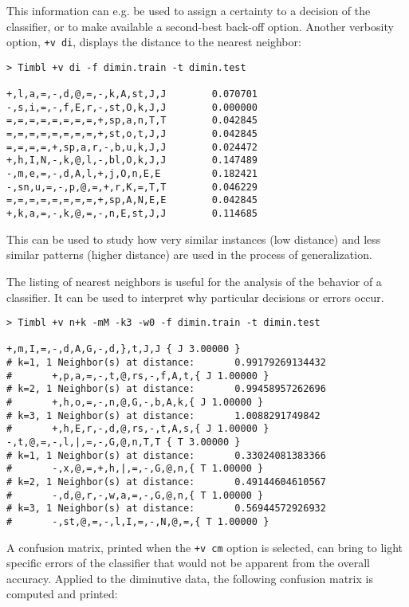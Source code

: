 \documentclass{report}
\begin{document}
This information can e.g. be used to assign a certainty to a decision
of the classifier, or to make available a second-best back-off
option. Another verbosity option, {\tt +v di}, displays the distance
to the nearest neighbor:

{\footnotesize
\begin{verbatim}
> Timbl +v di -f dimin.train -t dimin.test

+,l,a,=,-,d,@,=,-,k,A,st,J,J        0.070701
-,s,i,=,-,f,E,r,-,st,O,k,J,J        0.000000
=,=,=,=,=,=,=,=,+,sp,a,n,T,T        0.042845
=,=,=,=,=,=,=,=,+,st,o,t,J,J        0.042845
=,=,=,=,+,sp,a,r,-,b,u,k,J,J        0.024472
+,h,I,N,-,k,@,l,-,bl,O,k,J,J        0.147489
-,m,e,=,-,d,A,l,+,j,O,n,E,E         0.182421
-,sn,u,=,-,p,@,=,+,r,K,=,T,T        0.046229
=,=,=,=,=,=,=,=,+,sp,A,N,E,E        0.042845
+,k,a,=,-,k,@,=,-,n,E,st,J,J        0.114685        
\end{verbatim}
}

This can be used to study how very similar instances (low distance) and
less similar patterns (higher distance) are used in the process of
generalization.

The listing of nearest neighbors is useful for the analysis of the
behavior of a classifier. It can be used to interpret why particular
decisions or errors occur.

{\footnotesize
\begin{verbatim}
> Timbl +v n+k -mM -k3 -w0 -f dimin.train -t dimin.test

+,m,I,=,-,d,A,G,-,d,},t,J,J { J 3.00000 }
# k=1, 1 Neighbor(s) at distance:       0.99179269134432
#       +,p,a,=,-,t,@,rs,-,f,A,t,{ J 1.00000 }
# k=2, 1 Neighbor(s) at distance:       0.99458957262696
#       +,h,o,=,-,n,@,G,-,b,A,k,{ J 1.00000 }
# k=3, 1 Neighbor(s) at distance:       1.0088291749842
#       +,h,E,r,-,d,@,rs,-,t,A,s,{ J 1.00000 }
-,t,@,=,-,l,|,=,-,G,@,n,T,T { T 3.00000 }
# k=1, 1 Neighbor(s) at distance:       0.33024081383366
#       -,x,@,=,+,h,|,=,-,G,@,n,{ T 1.00000 }
# k=2, 1 Neighbor(s) at distance:       0.49144604610567
#       -,d,@,r,-,w,a,=,-,G,@,n,{ T 1.00000 }
# k=3, 1 Neighbor(s) at distance:       0.56944572926932
#       -,st,@,=,-,l,I,=,-,N,@,=,{ T 1.00000 }
\end{verbatim}
}

A confusion matrix, printed when the {\tt +v cm} option is selected,
can bring to light specific errors of the classifier that would not be
apparent from the overall accuracy. Applied to the diminutive data,
the following confusion matrix is computed and printed:
\end{document}
